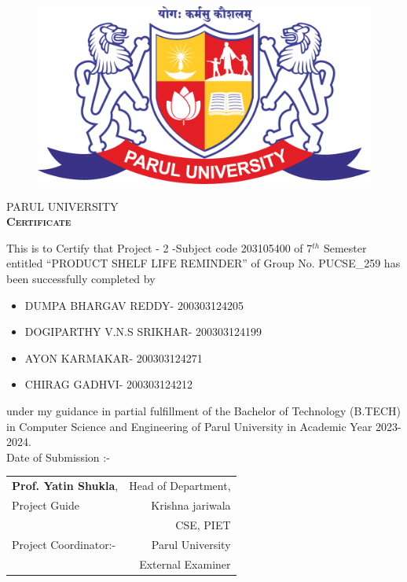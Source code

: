 \thispagestyle{plain}
\begin{figure}
    \centering
    \includegraphics[scale=0.1]{parullogo.png}
    \end{figure}
\vspace{1.5cm}
\begin{center}
    {\Huge \textsc{PARUL UNIVERSITY}}\\
   
    \vspace{1cm}
     {\Huge \bf \textsc{Certificate}}\\
     \vspace{0.5cm}
     \end{center}
     \large{This is to Certify that Project - 2 -Subject code 203105400 of 7$^{th}$ Semester entitled “PRODUCT SHELF LIFE REMINDER” of Group No. PUCSE\_259 has been successfully completed by}
     \begin{itemize}
     \centering
         \item DUMPA BHARGAV REDDY- 200303124205
         \item DOGIPARTHY V.N.S SRIKHAR- 200303124199
         \item AYON KARMAKAR- 200303124271
         \item CHIRAG GADHVI- 200303124212
     \end{itemize}
         
     \noindent
    \large {under my guidance in partial fulfillment of the Bachelor of Technology (B.TECH) in Computer Science and Engineering of Parul University in Academic Year 2023- 2024.}\\      
    Date of Submission :-
   
   \vspace{1.5cm}
   \begin{tabular}{l r}
   
      \textbf{Prof. Yatin Shukla}, & \hspace{4cm} Head of Department,  \\ 
      Project Guide & Krishna jariwala  \\  &  CSE, PIET\\
      Project Coordinator:-
      & Parul University\\ [7ex]  
      & External Examiner 
   \end{tabular}
   
   